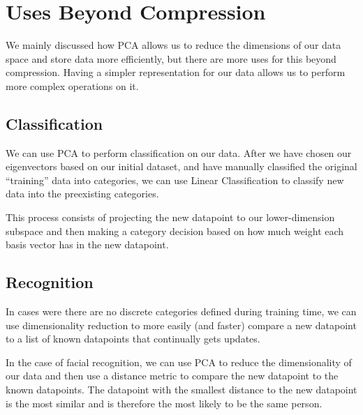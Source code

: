 \documentclass[12pt]{report}
\begin{document}
    \chapter{Uses Beyond Compression}
    We mainly discussed how PCA allows us to reduce the dimensions of our data space and store data more efficiently, but there are more uses for this beyond compression. Having a simpler representation for our data allows us to perform more complex operations on it.

    \section{Classification}
    We can use PCA to perform classification on our data. After we have chosen our eigenvectors based on our initial dataset, and have manually classified the original ``training'' data into categories, we can use Linear Classification \cite{Milon2019} to classify new data into the preexisting categories.

    This process consists of projecting the new datapoint to our lower-dimension subspace and then making a category decision based on how much weight each basis vector has in the new datapoint.

    \section{Recognition}
    In cases were there are no discrete categories defined during training time, we can use dimensionality reduction to more easily (and faster) compare a new datapoint to a list of known datapoints that continually gets updates.

    In the case of facial recognition, we can use PCA to reduce the dimensionality of our data and then use a distance metric to compare the new datapoint to the known datapoints. The datapoint with the smallest distance to the new datapoint is the most similar and is therefore the most likely to be the same person.

    
    \pagebreak
    
    
    
    
\end{document}
